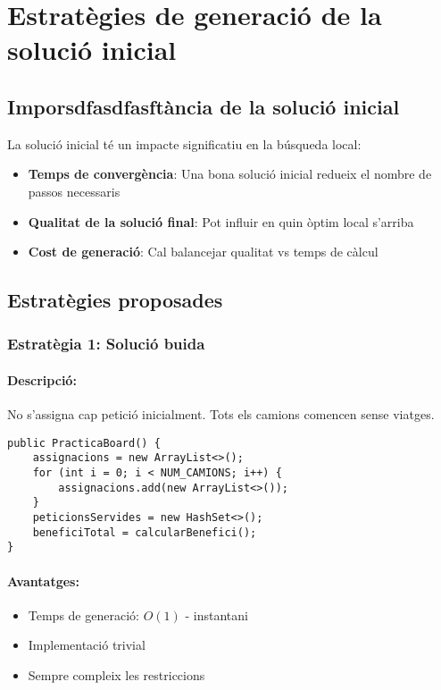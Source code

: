 \section{Estratègies de generació de la solució inicial}
\label{sec:initial}

\subsection{Imporsdfasdfasftància de la solució inicial}

La solució inicial té un impacte significatiu en la búsqueda local:

\begin{itemize}
    \item \textbf{Temps de convergència}: Una bona solució inicial redueix el nombre de passos necessaris
    \item \textbf{Qualitat de la solució final}: Pot influir en quin òptim local s'arriba
    \item \textbf{Cost de generació}: Cal balancejar qualitat vs temps de càlcul
\end{itemize}

\subsection{Estratègies proposades}

\subsubsection{Estratègia 1: Solució buida}

\paragraph{Descripció:}
No s'assigna cap petició inicialment. Tots els camions comencen sense viatges.

\begin{lstlisting}[caption={Implementació de solució buida}, label={lst:empty-init}]
public PracticaBoard() {
    assignacions = new ArrayList<>();
    for (int i = 0; i < NUM_CAMIONS; i++) {
        assignacions.add(new ArrayList<>());
    }
    peticionsServides = new HashSet<>();
    beneficiTotal = calcularBenefici();
}
\end{lstlisting}

\paragraph{Avantatges:}
\begin{itemize}
    \item Temps de generació: $O(1)$ - instantani
    \item Implementació trivial
    \item Sempre compleix les restriccions
\end{itemize}

